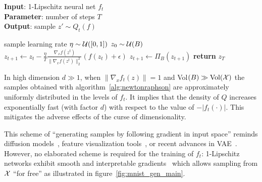 \begin{algorithm}%
\caption{Adapted Newton–Raphson for Complementary Distribution Generation}
\label{alg:newtonraphson}
\textbf{Input}: 1-Lipschitz neural net $f_t$\\
\textbf{Parameter}: number of steps $T$\\
\textbf{Output}: sample $z'\sim Q_t(f)$
\begin{algorithmic}[1] %
\STATE sample learning rate $\eta\sim\mathcal{U}([0,1])$
\STATE $z_0\sim\mathcal{U}(B)$  
\STATE $z_{t+1}\gets z_t-\frac{\eta}{T}\frac{\nabla_x f(z^t)}{\|\nabla_x f(z^t)\|_2^2}(f(z_t)+\epsilon)$
\STATE $z_{t+1}\gets \Pi_B(z_{t+1})$
\ENDFOR
\STATE \textbf{return} $z_T$
\end{algorithmic}
\end{algorithm}  


\begin{remark}\label{remark:stochasticity}
In high dimension $d\gg 1$, when $\|\nabla_x f_t(z)\|=1$ and Vol$(B)\gg \text{Vol}(\mathcal{X})$ the samples obtained with algorithm~\ref{alg:newtonraphson} are approximately uniformly distributed in the levels of $f_t$. It implies that the density of $Q$ increases exponentially fast (with factor $d$) with respect to the value of $-|f_t(\cdot)|$. This mitigates the adverse effects of the curse of dimensionality.   
\end{remark}
  
This scheme of ``generating samples by following gradient in input space'' reminds diffusion models~\cite{ho2020denoising}, feature visualization tools~\cite{olah2017feature}, or recent advances in VAE~\cite{kuzina2022alleviating}. However, no elaborated scheme is required for the training of $f_t$: 1-Lipschitz networks exhibit smooth and interpretable gradients~\cite{serrurier2022adversarial} which allows sampling from $\mathcal{X}$ ``for free'' as illustrated in figure~\ref{fig:mnist_gen_main}.  

